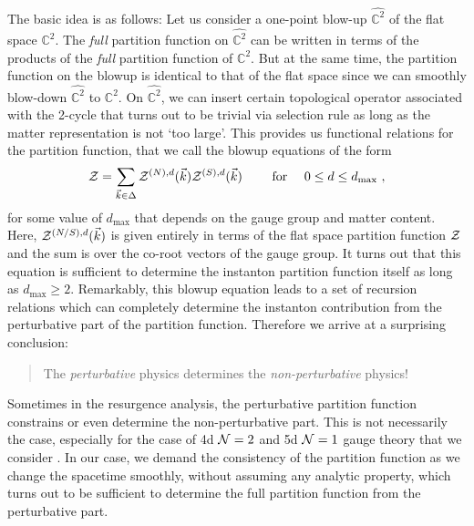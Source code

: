 \documentclass[letterpaper, 11pt]{article}
\def\IC{\mathbb{C}}
\def\CN{{\cal N}}
\def\CZ{{\cal Z}}
\begin{document}
The basic idea is as follows: Let us consider a one-point blow-up $\hat{\IC^2}$ of the flat space $\IC^2$. The \emph{full} partition function on $\hat{\IC^2}$ can be written in terms of the products of the \emph{full} partition function of $\IC^2$. But at the same time, the partition function on the blowup is identical to that of the flat space since we can smoothly blow-down $\hat{\IC^2}$ to $\IC^2$. On $\hat{\IC^2}$, we can insert certain topological operator associated with the 2-cycle that turns out to be trivial via selection rule as long as the matter representation is not `too large'. This provides us functional relations for the partition function, that we call the blowup equations of the form
\begin{align}
 \CZ = \sum_{\vec{k} \in \Delta} \CZ^{(N), d}(\vec{k}) \CZ^{(S), d}(\vec{k}) \qquad \textrm{ for }\quad 0 \le d \le d_{\text{max}} \ , 
\end{align}
for some value of $d_\text{max}$ that depends on the gauge group and matter content. Here, $\CZ^{(N/S), d} (\vec{k})$ is given entirely in terms of the flat space partition function $\CZ$ and the sum is over the co-root vectors of the gauge group. 
It turns out that this equation is sufficient to determine the instanton partition function itself as long as $d_\text{max} \ge 2$. Remarkably, this blowup equation leads to a set of recursion relations which can completely determine the instanton contribution from the perturbative part of the partition function. Therefore we arrive at a surprising conclusion: 
\begin{quote}
\centering
The \emph{perturbative} physics determines the \emph{non-perturbative} physics! 	
\end{quote}
Sometimes in the resurgence analysis, the perturbative partition function constrains or even determine the non-perturbative part. This is not necessarily the case, especially for the case of 4d $\CN=2$ and 5d $\CN=1$ gauge theory that we consider \cite{Honda:2016mvg}. In our case, we demand the consistency of the partition function as we change the spacetime smoothly, without assuming any analytic property, which turns out to be sufficient to determine the full partition function from the perturbative part. 
\end{document}
